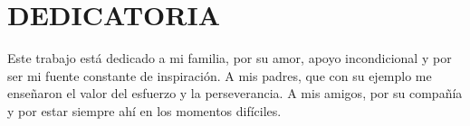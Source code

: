 \chapter*{DEDICATORIA}


Este trabajo está dedicado a mi familia, por su amor, apoyo incondicional y por ser mi
fuente constante de inspiración. A mis padres, que con su ejemplo me enseñaron el valor
del esfuerzo y la perseverancia. A mis amigos, por su compañía y por estar siempre ahí en
los momentos difíciles.

